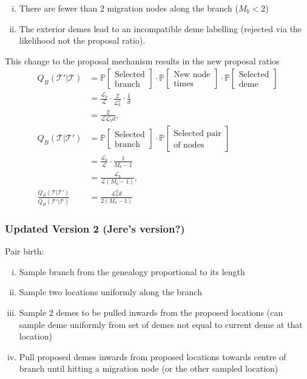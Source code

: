 \documentclass[12pt,a4paper]{article}
\newcommand{\calL}{\mathcal{L}}
\newcommand{\calT}{\mathcal{T}}
\newcommand{\bbP}{\mathbb{P}}
\begin{document}
					\begin{enumerate}[(i)]
						\item There are fewer than 2 migration nodes along the branch ($M_b < 2$) 
						\item The exterior demes lead to an incompatible deme labelling (rejected via the likelihood not the proposal ratio).
					\end{enumerate}
				
				This change to the proposal mechanism results in the new proposal ratios
					\begin{align*}
						Q_B(\calT' | \calT) & = \bbP[ \substack{\text{Selected} \\ \text{branch}}] \cdot \bbP[ \substack{\text{New node} \\ \text{times}}] \cdot \bbP[\substack{\text{Selected} \\ \text{deme}}] \\
							& = \frac{\calL_b}{\calL} \cdot \frac{2}{\calL_b^2} \cdot \frac{1}{d} \\
							& = \frac{2}{\calL \calL_b d}, \\
						Q_B (\calT | \calT') & = \bbP[\substack{\text{Selected} \\ \text{branch}}] \cdot \bbP[\substack{\text{Selected pair} \\ \text{of nodes}}] \\
							& = \frac{\calL_b}{\calL} \cdot \frac{1}{M_b - 1} \\
							& = \frac{\calL_b}{\calL (M_b - 1)}, \\
						\frac{Q_B (\calT | \calT')}{Q_B (\calT' | \calT)} & = \frac{\calL_b ^2 d}{2(M_b - 1)}
					\end{align*}
			
			\subsubsection{Updated Version 2 (Jere's version?)}
				Pair birth:
					\begin{enumerate}[(i)]
						\item Sample branch from the genealogy proportional to its length
						\item Sample two locations uniformly along the branch
						\item Sample 2 demes to be pulled inwards from the proposed locations (can sample deme uniformly from set of demes not equal to current deme at that location)
						\item Pull proposed demes inwards from proposed locations towards centre of branch until hitting a migration node (or the other sampled location)
					\end{enumerate}
			
\end{document}
